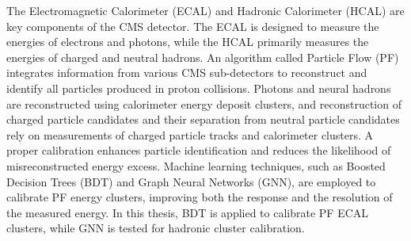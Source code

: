 
The Electromagnetic Calorimeter (ECAL) and Hadronic Calorimeter (HCAL) are key components of the CMS detector.
The ECAL is designed to measure the energies of electrons and photons, while the HCAL primarily measures the energies of charged and neutral hadrons.
An algorithm called Particle Flow (PF) integrates information from various CMS sub-detectors to reconstruct and identify all particles produced in proton collisions.
Photons and neural hadrons are reconstructed using calorimeter energy deposit clusters,
and reconstruction of charged particle candidates and their separation from neutral particle candidates rely on measurements of charged particle tracks and calorimeter clusters.
%
A proper calibration enhances particle identification and reduces the likelihood of misreconstructed energy excess.
Machine learning techniques, such as Boosted Decision Trees (BDT) and Graph Neural Networks (GNN), are employed to calibrate PF energy clusters, improving both the response and the resolution of the measured energy. 
In this thesis, BDT is applied to calibrate PF ECAL clusters, while GNN is tested for hadronic cluster calibration. %





